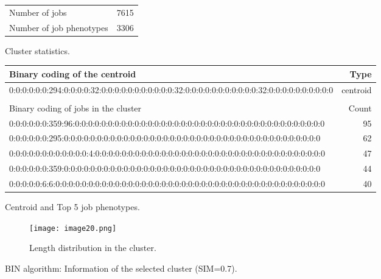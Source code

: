 \documentclass{jhps}
\begin{document}
\begin{cluster}
	\begin{subtable}{\textwidth}
		\centering
		\begin{tabular}{lr}
			Number of jobs & 7615 \\
			Number of job phenotypes & 3306 \\
		\end{tabular}
		\caption{Cluster statistics.}
		\label{cluster:bin_all:stats}
	\end{subtable}
	\medskip
	\begin{subtable}{\textwidth}
		\centering
		\begin{tiny}
			\begin{tabular}{l|r}
				\rowcolor{tblhead}
				Binary coding of the centroid                                                                    &  Type     \\ 
				\hline
				0:0:0:0:0:0:294:0:0:0:0:32:0:0:0:0:0:0:0:0:0:0:0:32:0:0:0:0:0:0:0:0:0:0:0:32:0:0:0:0:0:0:0:0:0:0 &  centroid \\ 
				\multicolumn{2}{l}{}                                                                             \\ 
				\rowcolor{tblhead}
				Binary coding of jobs in the cluster                                                             &  Count    \\ 
				\hline
				0:0:0:0:0:0:359:96:0:0:0:0:0:0:0:0:0:0:0:0:0:0:0:0:0:0:0:0:0:0:0:0:0:0:0:0:0:0:0:0:0:0:0:0:0:0   &  95       \\ 
				0:0:0:0:0:0:295:0:0:0:0:0:0:0:0:0:0:0:0:0:0:0:0:0:0:0:0:0:0:0:0:0:0:0:0:0:0:0:0:0:0:0:0:0:0:0    &  62       \\ 
				0:0:0:0:0:0:0:0:0:0:0:0:4:0:0:0:0:0:0:0:0:0:0:0:0:0:0:0:0:0:0:0:0:0:0:0:0:0:0:0:0:0:0:0:0:0:0:0  &  47       \\ 
				0:0:0:0:0:0:359:0:0:0:0:0:0:0:0:0:0:0:0:0:0:0:0:0:0:0:0:0:0:0:0:0:0:0:0:0:0:0:0:0:0:0:0:0:0:0    &  44       \\ 
				0:0:0:0:0:6:6:0:0:0:0:0:0:0:0:0:0:0:0:0:0:0:0:0:0:0:0:0:0:0:0:0:0:0:0:0:0:0:0:0:0:0:0:0:0:0:0:0  &  40       \\ 
			\end{tabular}
		\end{tiny}
		\caption{Centroid and Top 5 job phenotypes.}
		\label{cluster:bin_all:top_jobs}
	\end{subtable}
	\medskip
	\begin{subfigure}{\textwidth}
		\centering
		\texttt{[image: image20.png]}
		\caption{Length distribution in the cluster.}
		\label{cluster:bin_all:length}
	\end{subfigure}
	\caption{BIN algorithm: Information of the selected cluster (SIM=0.7).}
	\label{cluster:bin_all}
\end{cluster}
\end{document}
